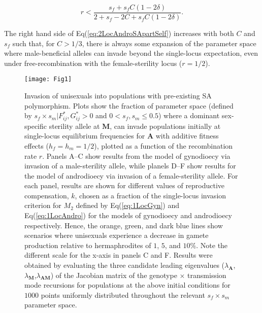 \documentclass[9pt,twocolumn,twoside,lineno]{gsajnl}
\begin{document}
\begin{equation}\label{eq:2LocAndroSApartSelf}
	r < \frac{s_f + s_f C (1 - 2 \delta)}{2 + s_f - 2 C + s_f C (1 - 2 \delta)}.
\end{equation}

\noindent The right hand side of Eq(\ref{eq:2LocAndroSApartSelf}) increases with both $C$ and $s_f$ such that, for $C > 1/3$, there is always some expansion of the parameter space where male-beneficial alleles can invade beyond the single-locus expectation, even under free-recombination with the female-sterility locus ($r = 1/2$). 


\begin{figure}[htbp]
\centering
\texttt{[image: Fig1]}
\caption{Invasion of unisexuals into populations with pre-existing SA polymorphism. Plots show the fraction of parameter space (defined by $s_f \times s_m | F^{\ast}_{ij},G^{\ast}_{ij} > 0$ and $0 < s_f,s_m \leq 0.5$) where a dominant sex-specific sterility allele at $\mathbf{M}$, can invade populations initially at single-locus equilibrium frequencies for $\mathbf{A}$ with additive fitness effects ($h_f=h_m=1/2$), plotted as a function of the recombination rate $r$. Panels A--C show results from the model of gynodioecy via invasion of a male-sterility allele, while planels D--F show results for the model of androdioecy via invasion of a female-sterility allele. For each panel, results are shown for different values of reproductive compensation, $k$, chosen as a fraction of the single-locus invasion criterion for $M_2$ defined by Eq(\ref{eq:1LocGyn}) and Eq(\ref{eq:1LocAndro}) for the models of gynodioecy and androdioecy respectively. Hence, the orange, green, and dark blue lines show scenarios where unisexuals experience a decrease in gamete production relative to hermaphrodites of $1$, $5$, and $10\%$. Note the different scale for the x-axis in panels C and F. Results were obtained by evaluating the three candidate leading eigenvalues ($\lambda_{\mathbf{A}}$,$\lambda_{\mathbf{M}}$,$\lambda_{\mathbf{AM}}$) of the Jacobian matrix of the genotype $\times$ transmission mode recursions for populations at the above initial conditions for $1000$ points uniformly distributed throughout the relevant $s_f \times s_m$ parameter space.}
\label{fig:PrInv}
\end{figure}

\end{document}
